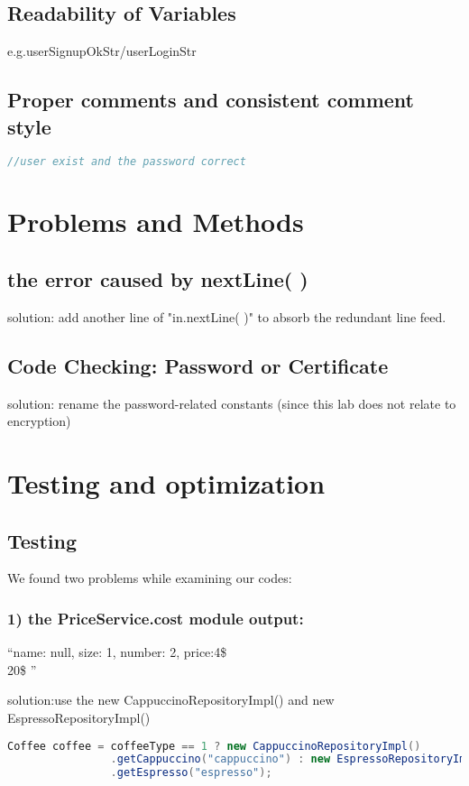 \documentclass[./report.tex]{subfiles}
\begin{document}
    \subsection{Readability of Variables}
    \par e.g.userSignupOkStr/userLoginStr
    
 \subsection{Proper comments and consistent comment style}
   \begin{lstlisting}[language=java]
//user exist and the password correct
\end{lstlisting}   
\section{Problems and Methods}
    \subsection{the error caused by nextLine( )}
    \par solution: add another line of "in.nextLine( )" to absorb the redundant line feed.
    \subsection{Code Checking: Password or Certificate }
    \par solution: rename the password-related constants (since this lab does not relate to encryption)

\section{Testing and optimization}
	\subsection{Testing}
	\par We found two problems while examining our codes:
		\subsubsection{1) the PriceService.cost module output:}
		\par ``name: null, size: 1, number: 2, price:4\$ \\ 20\$  ''
		\par 	solution:use the new CappuccinoRepositoryImpl() and new EspressoRepositoryImpl()
		\par
  \begin{lstlisting}[language=java]
Coffee coffee = coffeeType == 1 ? new CappuccinoRepositoryImpl()
                .getCappuccino("cappuccino") : new EspressoRepositoryImpl()
                .getEspresso("espresso");
\end{lstlisting}
\end{document}
